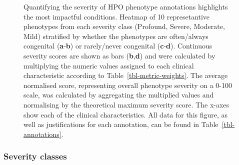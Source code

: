 \documentclass[
]{agujournal2019}
\begin{document}
\label{cell-fig-top-phenos}
\begin{figure}[H]


\caption{\label{fig-top-phenos}Quantifying the severity of HPO phenotype
annotations highlights the most impactful conditions. Heatmap of 10
represetantive phenotypes from each severity class (Profound, Severe,
Moderate, Mild) stratified by whether the phenotypes are often/always
congenital (\textbf{a}-\textbf{b}) or rarely/never congenital
(\textbf{c}-\textbf{d}). Continuous severity scores are shown as bars
(\textbf{b},\textbf{d}) and were calculated by multiplying the numeric
values assigned to each clinical characteristic according to
Table~\ref{tbl-metric-weights}. The average normalised score,
representing overall phenotype severity on a 0-100 scale, was calculated
by aggregating the multiplied values and normalising by the theoretical
maximum severity score. The x-axes show each of the clinical
characteristics. All data for this figure, as well as justifications for
each annotation, can be found in Table~\ref{tbl-annotations}.}

\end{figure}%

\subsubsection{Severity classes}\label{severity-classes}
\end{document}
